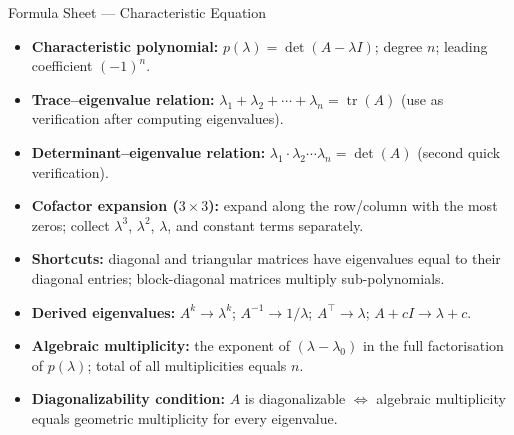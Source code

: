 \documentclass[12pt,a4paper]{article}
\begin{document}
\begin{learnbox}{Formula Sheet --- Characteristic Equation}
\begin{itemize}[leftmargin=*]
  \item \textbf{Characteristic polynomial:} $p(\lambda)=\det(A-\lambda I)$; degree $n$; leading coefficient $(-1)^n$.
  \item \textbf{Trace--eigenvalue relation:} $\lambda_1+\lambda_2+\cdots+\lambda_n=\operatorname{tr}(A)$ (use as verification after computing eigenvalues).
  \item \textbf{Determinant--eigenvalue relation:} $\lambda_1\cdot\lambda_2\cdots\lambda_n=\det(A)$ (second quick verification).
  \item \textbf{Cofactor expansion ($3\times3$):} expand along the row/column with the most zeros; collect $\lambda^3$, $\lambda^2$, $\lambda$, and constant terms separately.
  \item \textbf{Shortcuts:} diagonal and triangular matrices have eigenvalues equal to their diagonal entries; block-diagonal matrices multiply sub-polynomials.
  \item \textbf{Derived eigenvalues:} $A^k \to \lambda^k$; $A^{-1}\to 1/\lambda$; $A^\top\to\lambda$; $A+cI\to\lambda+c$.
  \item \textbf{Algebraic multiplicity:} the exponent of $(\lambda-\lambda_0)$ in the full factorisation of $p(\lambda)$; total of all multiplicities equals $n$.
  \item \textbf{Diagonalizability condition:} $A$ is diagonalizable $\Leftrightarrow$ algebraic multiplicity equals geometric multiplicity for every eigenvalue.
\end{itemize}
\end{learnbox}
\end{document}
